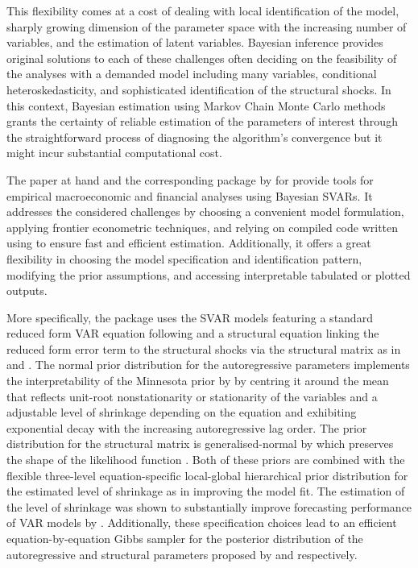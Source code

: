 \documentclass[
  nojss]{jss}
\begin{document}
This flexibility comes at a cost of dealing with local identification of
the model, sharply growing dimension of the parameter space with the
increasing number of variables, and the estimation of latent variables.
Bayesian inference provides original solutions to each of these
challenges often deciding on the feasibility of the analyses with a
demanded model including many variables, conditional heteroskedasticity,
and sophisticated identification of the structural shocks. In this
context, Bayesian estimation using Markov Chain Monte Carlo methods
grants the certainty of reliable estimation of the parameters of
interest through the straightforward process of diagnosing the
algorithm's convergence but it might incur substantial computational
cost.

The paper at hand and the corresponding package  by
\cite{bsvars} for  \citep{Rcore} provide tools for empirical
macroeconomic and financial analyses using Bayesian SVARs. It addresses
the considered challenges by choosing a convenient model formulation,
applying frontier econometric techniques, and relying on compiled code
written using  to ensure fast and efficient estimation.
Additionally, it offers a great flexibility in choosing the model
specification and identification pattern, modifying the prior
assumptions, and accessing interpretable tabulated or plotted outputs.

More specifically, the package uses the SVAR models featuring a standard
reduced form VAR equation following \cite{Banbura2010}
\citep[see also][]{Wozniak2016} and a structural equation linking the
reduced form error term to the structural shocks via the structural
matrix as in \cite{LSUW2024} and \cite{chankoopyu2024}. The normal prior
distribution for the autoregressive parameters implements the
interpretability of the Minnesota prior by \cite{Doan1984} by centring
it around the mean that reflects unit-root nonstationarity or
stationarity of the variables and a adjustable level of shrinkage
depending on the equation and exhibiting exponential decay with the
increasing autoregressive lag order. The prior distribution for the
structural matrix is generalised-normal by \cite{WaggonerZha2003} which
preserves the shape of the likelihood function
\citep[see][]{Wozniak2015}. Both of these priors are combined with the
flexible three-level equation-specific local-global hierarchical prior
distribution for the estimated level of shrinkage as in \cite{LSUW2024}
improving the model fit. The estimation of the level of shrinkage was
shown to substantially improve forecasting performance of VAR models by
\cite{Giannone2015}. Additionally, these specification choices lead to
an efficient equation-by-equation Gibbs sampler for the posterior
distribution of the autoregressive and structural parameters proposed by
\cite{chankoopyu2024} and \cite{WaggonerZha2003} respectively.
\end{document}
